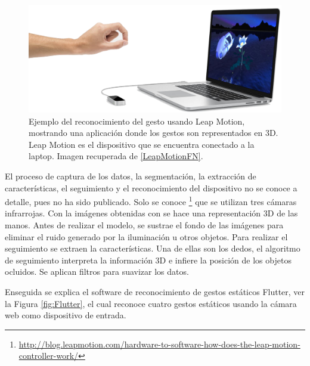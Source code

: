 \begin{figure}[h!]
\begin{center}
\includegraphics[scale=.3]{./Figures/LeapMotion.png}
\end{center}
\caption{Ejemplo del reconocimiento del gesto usando Leap Motion, mostrando una aplicación donde los gestos son representados en 3D. Leap Motion es el dispositivo que se encuentra conectado a la laptop. Imagen recuperada de \ref{LeapMotionFN}.}
\label{fig:LeapMotion}
\end{figure}

El proceso de captura de los datos, la segmentación, la extracción de características, el seguimiento y el reconocimiento del dispositivo no se conoce a detalle, pues no ha sido publicado.
Solo se conoce \footnote{ \url{http://blog.leapmotion.com/hardware-to-software-how-does-the-leap-motion-controller-work/}} que se utilizan tres cámaras infrarrojas. Con la imágenes obtenidas con se hace una representación 3D de las manos. Antes de realizar el modelo,  se sustrae el fondo de las imágenes para eliminar el ruido generado por la iluminación u otros objetos. 
Para realizar el seguimiento se extraen la características. Una de ellas son los dedos, el algoritmo de seguimiento interpreta la información 3D e infiere la posición de los objetos ocluidos. Se aplican filtros para suavizar los datos. 

Enseguida se explica el software de reconocimiento de gestos estáticos Flutter, ver la Figura \ref{fig:Flutter}, el cual reconoce cuatro gestos estáticos usando la cámara web como dispositivo de entrada. 

